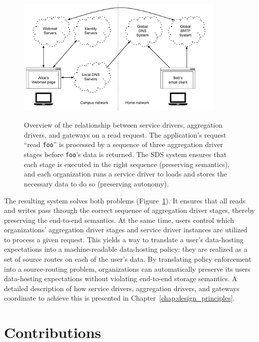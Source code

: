 \begin{figure}[h]
   \caption{Overview of the relationship between service drivers, aggregation
   drivers, and gateways on a read request.  The application's request ``read \texttt{foo}'' is
   processed by a sequence of three aggregation driver stages before
   \texttt{foo}'s data is returned.  The SDS system ensures that each stage is
   executed in the right sequence (preserving semantics),
   and each organization runs a service driver to loads and stores the
   necessary data to do so (preserving autonomy).}
   \centering
   \includegraphics[width=0.9\textwidth,page=33]{figures/dissertation-figures}
   \label{fig:chap1-sds-implementation-overview}
\end{figure}

The resulting system solves both problems
(Figure~\ref{fig:chap1-sds-implementation-overview}).
It ensures that all reads and writes pass through the
correct sequence of aggregation driver
stages, thereby preserving the end-to-end semantics.  At the same time, users 
control which organizations' aggregation driver stages and service driver
instances are utilized to process a given request.  This yields a way to
translate a user's data-hosting expectations into a
machine-readable data-hosting policy:  they are realized as a set of source
routes on each of the user's data.  By translating policy enforcement into
a source-routing problem, organizations can automatically
preserve its users data-hosting expectations without
violating end-to-end storage semantics.  A detailed description
of how service drivers, aggregation
drivers, and gateways coordinate to achieve this is presented in
Chapter~\ref{chap:design_principles}.

\section{Contributions}

